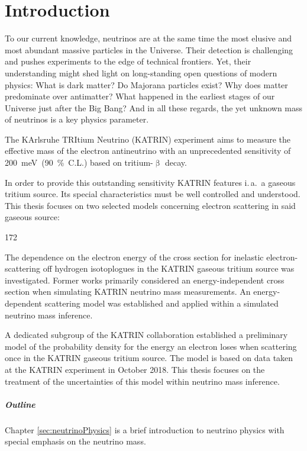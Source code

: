 \chapter{Introduction}
To our current knowledge, neutrinos are at the same time the most elusive and most abundant massive particles in the Universe. Their detection is challenging and pushes experiments to the edge of technical frontiers. Yet, their understanding might shed light on long-standing open questions of modern physics: What is dark matter? Do Majorana particles exist? Why does matter predominate over antimatter? What happened in the earliest stages of our Universe just after the Big Bang? And in all these regards, the yet unknown mass of neutrinos is a key physics parameter.

The KArlsruhe TRItium Neutrino (KATRIN) experiment aims to measure the effective mass of the electron antineutrino with an unprecedented sensitivity of \mbox{\SI{200}{meV} (\SI{90}{\percent} C.L.)} based on tritium-$\upbeta$ decay. 

In order to provide this outstanding sensitivity KATRIN features i.\,a.~a gaseous tritium source. Its special characteristics must be well controlled and understood. This thesis focuses on two selected models concerning electron scattering in said gaseous source: 
\begin{dingautolist}{172}
	\item\label{itm:introductionEDepCrossSec} The dependence on the electron energy of the cross section for inelastic electron-scattering off hydrogen isotoplogues in the KATRIN gaseous tritium source was investigated. Former works primarily considered an energy-independent cross section when simulating KATRIN neutrino mass measurements. An energy-dependent scattering model was established and applied within a simulated neutrino mass inference.
	\item\label{itm:introductionKatrinEloss} A dedicated subgroup of the KATRIN collaboration established a preliminary model of the probability density for the energy an electron loses when scattering once in the KATRIN gaseous tritium source. The model is based on data taken at the KATRIN experiment in October 2018. This thesis focuses on the treatment of the uncertainties of this model within neutrino mass inference.
\end{dingautolist}

\paragraph{Outline}
Chapter \ref{sec:neutrinoPhysics} is a brief introduction to neutrino physics with special emphasis on the neutrino mass.


